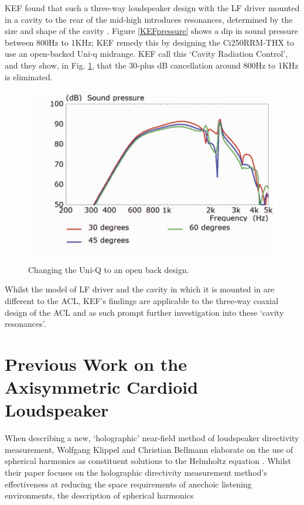 \documentclass{report}
\begin{document}
        KEF found that such a three-way loudspeaker design with the LF driver mounted in a cavity to the rear of the mid-high introduces resonances, determined by the size and shape of the cavity \cite{KEFCi}.
        Figure \ref{KEFpressure} shows a dip in sound pressure between 800Hz to 1KHz; KEF remedy this by designing the Ci250RRM-THX to use an open-backed Uni-q midrange.
        KEF call this `Cavity Radiation Control', and they show, in Fig. \ref{KEFopenback}, that the 30-plus dB cancellation around 800Hz to 1KHz is eliminated.
        \begin{figure}[H]
            \centering
            \includegraphics[scale=0.5]{figs/KEFopenback.png}
            \caption{Changing the Uni-Q to an open back design.}\cite{KEFCi}
            \label{KEFopenback}
        \end{figure}
        Whilst the model of LF driver and the cavity in which it is mounted in are different to the ACL, KEF's findings are applicable to the three-way coaxial design of the ACL and as such prompt further investigation into these `cavity resonances'.

    \section{Previous Work on the Axisymmetric Cardioid Loudspeaker} 
        When describing a new, `holographic' near-field method of loudspeaker directivity measurement, Wolfgang Klippel and Christian Bellmann elaborate on the use of spherical harmonics as constituent solutions to the Helmholtz equation \cite{klippel2016holographic}.
        Whilst their paper focuses on the holographic directivity measurement method's effectiveness at reducing the space requirements of anechoic listening environments, the description of spherical harmonics
        
\end{document}
